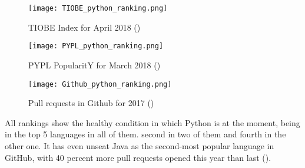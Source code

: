 \begin{figure}[!ht]
	\centering
	\texttt{[image: TIOBE\_python\_ranking.png]}
	\caption{TIOBE Index for April 2018 (\cite{tiobe_index})}
	\label{fig:tiobe_rank}
\end{figure}

\begin{figure}[!ht]
	\centering
	\texttt{[image: PYPL\_python\_ranking.png]}
	\caption{PYPL PopularitY for March 2018 (\cite{pypl_pop_rank})}
	\label{fig:pypl_rank}
\end{figure}

\begin{figure}[!ht]
	\centering
	\texttt{[image: Github\_python\_ranking.png]}
	\caption{Pull requests in Github for 2017 (\cite{octoverse_2017})}
	\label{fig:github_octoverse_rank}
\end{figure}

All rankings show the healthy condition in which Python is at the moment, being in the top 5 languages in all of them. second in two of them and fourth in the other one. It has even unseat Java as the second-most popular language in GitHub, with 40 percent more pull requests opened this year than last (\cite{octoverse_2017}). 